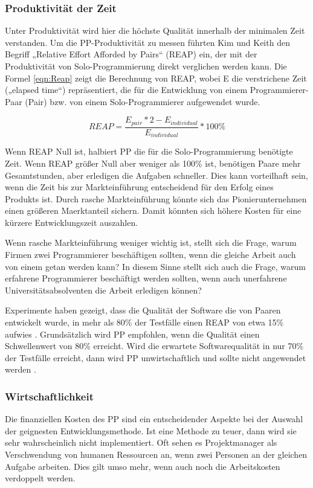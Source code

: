 \subsubsection {Produktivität der Zeit} Unter Produktivität wird hier die höchste Qualität innerhalb der minimalen Zeit verstanden. Um die PP-Produktivität zu messen führten Kim und Keith \cite{Lui2006PairExpertexpert} den Begriff „Relative Effort Afforded by Pairs“ (REAP) ein, der mit der Produktivität von Solo-Programmierung direkt verglichen werden kann. Die Formel \ref{eqn:Reap} zeigt die Berechnung von REAP, wobei E die verstrichene Zeit („elapsed time“) repräsentiert, die für die Entwicklung von einem Programmierer-Paar (Pair) bzw. von einem Solo-Programmierer aufgewendet wurde.



\begin{equation}
\label{eqn:Reap}
REAP = \frac{E_{pair} * 2 - E_{individual}}{E_{individual}} * 100\%
\end{equation}

Wenn REAP Null ist, halbiert PP die für die Solo-Programmierung benötigte Zeit. Wenn REAP größer Null aber weniger als 100\% ist, benötigen Paare mehr Gesamtstunden, aber erledigen die Aufgaben schneller. Dies kann vorteilhaft sein, wenn die Zeit bis zur Markteinführung entscheidend für den Erfolg eines Produkts ist. Durch rasche Markteinführung könnte sich das Pionierunternehmen einen größeren Maerktanteil sichern. Damit könnten sich höhere Kosten für eine kürzere Entwicklungszeit auszahlen.

Wenn rasche Markteinführung weniger wichtig ist, stellt sich die Frage, warum Firmen zwei Programmierer beschäftigen sollten, wenn die gleiche Arbeit auch von einem getan werden kann? In diesem Sinne stellt sich auch die Frage, warum erfahrene Programmierer beschäftigt werden sollten, wenn auch unerfahrene Universitätsabsolventen die Arbeit erledigen können? \cite{Lui2006PairExpertexpert}

Experimente haben gezeigt, dass die Qualität der Software die von Paaren entwickelt wurde, in mehr als 80\% der Testfälle einen REAP von etwa 15\% aufwies \cite{Williams2000StrengtheningPair-Programming}. Grundsätzlich wird PP empfohlen, wenn die Qualität einen Schwellenwert von 80\% erreicht. Wird die erwartete Softwarequalität in nur 70\% der Testfälle erreicht, dann wird PP unwirtschaftlich und sollte nicht angewendet werden \cite{Lui2006PairExpertexpert}.

\subsubsection{ Wirtschaftlichkeit} Die finanziellen Kosten des PP sind ein entscheidender Aspekte bei der Auswahl der geignesten Entwicklungsmethode. Ist eine Methode zu teuer, dann wird sie sehr wahrscheinlich nicht implementiert. Oft sehen es Projektmanager als Verschwendung von humanen Ressourcen an,  wenn zwei Personen an der gleichen Aufgabe arbeiten. Dies gilt umso mehr, wenn auch noch  die Arbeitskosten verdoppelt werden.

